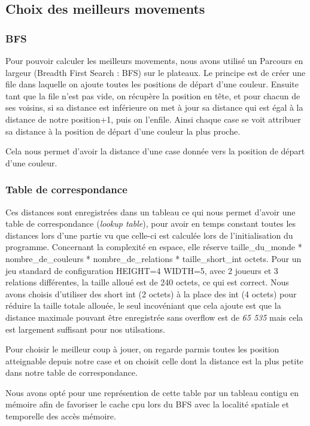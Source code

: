 \subsection{Choix des meilleurs movements}
\subsubsection{BFS}
Pour pouvoir calculer les meilleurs movements, nous avons utilisé un Parcours en largeur (Breadth First Search : BFS) sur le plateaux. 
Le principe est de créer une file dans laquelle on ajoute toutes les positions de départ d'une couleur.
Ensuite tant que la file n'est pas vide, on récupère la position en tête, et pour chacun de ses voisins, 
si sa distance est inférieure on met à jour sa distance qui est égal à la distance de notre position+1,
puis on l'enfile.
Ainsi chaque case se voit attribuer sa distance à la position de départ d'une couleur la plus proche. 
 
Cela nous permet d'avoir la distance d'une case donnée vers la position de départ d'une couleur.
\subsubsection{Table de correspondance}

Ces distances sont enregistrées dans un tableau ce qui nous permet d'avoir une table de correspondance (\emph{lookup table}),
pour avoir en temps constant toutes les distances lors d'une partie vu que celle-ci est calculée lors de l'initialisation
du programme. Concernant la complexité en espace, elle réserve 
taille\_du\_monde * nombre\_de\_couleurs * nombre\_de\_relations * taille\_short\_int octets. Pour un jeu standard de configuration
 HEIGHT=4 WIDTH=5, avec 2 joueurs et 3 relations différentes, la taille alloué est de 240 octets, ce qui est correct.
Nous avons choisis d'utiliser des short int (2 octets) à la place des int (4 octets) pour réduire la taille totale allouée,
le seul incovéniant que cela ajoute est que la distance maximale pouvant être enregistrée sans overflow est de \emph{65 535} mais cela
est largement suffisant pour nos utilsations.     

Pour choisir le meilleur coup à jouer, on regarde parmis toutes les position atteignable depuis 
notre case et on choisit celle dont la distance est la plus petite dans notre table de correspondance.

Nous avons opté pour une représention de cette table par un tableau contigu en mémoire afin de favoriser le cache cpu
lors du BFS avec la localité spatiale et temporelle des accès mémoire. 

